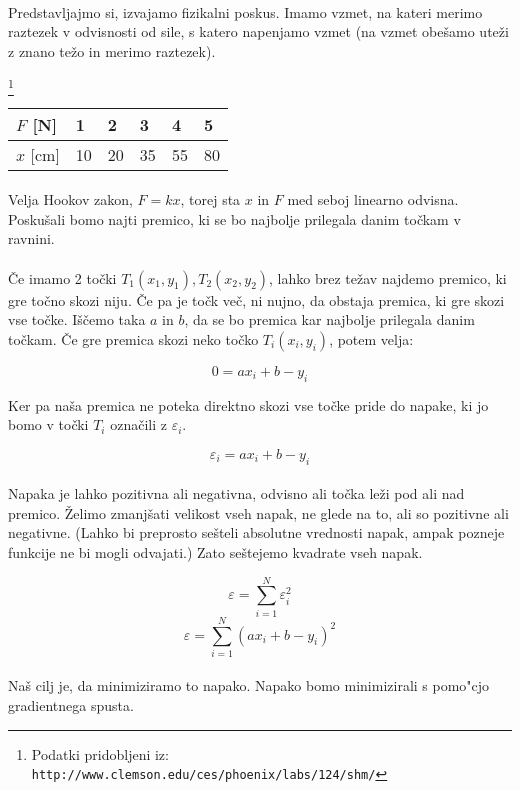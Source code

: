 \paragraph{}
	Predstavljajmo si, izvajamo fizikalni poskus. Imamo vzmet, na kateri merimo raztezek v odvisnosti od sile, s katero napenjamo vzmet (na vzmet obešamo uteži z znano težo in merimo raztezek).

	\footnote{Podatki pridobljeni iz: \texttt{http://www.clemson.edu/ces/phoenix/labs/124/shm/}}
	\begin{tabular}{l|lllll}
		$F$ {[}N{]}  & 1  & 2  & 3  & 4  & 5  \\ \hline
		$x$ {[}cm{]} & 10 & 20 & 35 & 55 & 80
	\end{tabular}

	\paragraph{}
	Velja Hookov zakon, $F = k x$, torej sta $x$ in $F$ med seboj linearno odvisna. Poskušali bomo najti premico, ki se bo najbolje prilegala danim točkam v ravnini.

	\paragraph{}
	Če imamo 2 točki $T_1(x_1, y_1), T_2(x_2, y_2)$, lahko brez težav najdemo premico, ki gre točno skozi niju. Če pa je točk več, ni nujno, da obstaja premica, ki gre skozi vse točke.
	Iščemo taka $a$ in $b$, da se bo premica kar najbolje prilegala danim točkam. Če gre premica skozi neko točko $T_i(x_i, y_i)$, potem velja:

	$$0 = a x_i + b - y_i$$

	Ker pa naša premica ne poteka direktno skozi vse točke pride do napake, ki jo bomo v točki $T_i$ označili z $\varepsilon_i$.

	$$\varepsilon_i = a x_i + b - y_i$$

	\paragraph{}
	Napaka je lahko pozitivna ali negativna, odvisno ali točka leži pod ali nad premico. Želimo zmanjšati velikost vseh napak, ne glede na to, ali so pozitivne ali negativne. (Lahko bi preprosto sešteli absolutne vrednosti napak, ampak pozneje funkcije ne bi mogli odvajati.) Zato seštejemo kvadrate vseh napak.

	$$\varepsilon = \sum_{i=1}^{N} \varepsilon_i^2$$
	$$\varepsilon = \sum_{i=1}^{N} (a x_i + b - y_i)^2$$

	\paragraph{}
	Naš cilj je, da minimiziramo to napako. Napako bomo minimizirali s pomo"cjo gradientnega spusta.